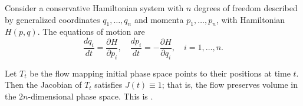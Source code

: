 Consider a conservative Hamiltonian system with $n$ degrees of freedom described by generalized coordinates $q_1, \ldots, q_n$ and momenta $p_1, \ldots, p_n$, with Hamiltonian $H(p,q)$. The equations of motion are
$$\frac{dq_i}{dt} = \frac{\partial H}{\partial p_i}, \quad \frac{dp_i}{dt} = -\frac{\partial H}{\partial q_i}, \quad i = 1, \ldots, n.$$

Let $T_t$ be the flow mapping initial phase space points to their positions at time $t$. Then the Jacobian of $T_t$ satisfies $J(t) \equiv 1$; that is, the flow preserves volume in the $2n$-dimensional phase space. This is .
